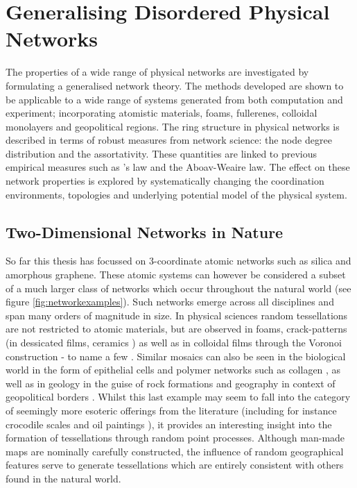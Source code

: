 \chapter{Generalising Disordered Physical Networks}
\label{ch:generalnetworks}

\begin{chapterabstract}
The properties of a wide range of physical \td{} networks are investigated by formulating a generalised network theory.
The methods developed are shown to be applicable to a wide range of systems generated from both computation and experiment; incorporating atomistic materials, foams, fullerenes, colloidal monolayers and geopolitical regions.
The ring structure in physical networks is described in terms of robust measures from network science: the node degree distribution and the assortativity.
These quantities are linked to previous empirical measures such as \lm's law and the Aboav\--Weaire law.
The effect on these network properties is explored by systematically changing the coordination environments, topologies and underlying potential model of the physical system.
\end{chapterabstract}

\section{Two\--Dimensional Networks in Nature}

So far this thesis has focussed on 3\--coordinate atomic networks such as silica and amorphous graphene.
These atomic systems can however be considered a subset of a much larger class of \td{} networks which occur throughout the natural world (see figure \ref{fig:networkexamples}).
Such networks emerge across all disciplines and span many orders of magnitude in size.
In physical sciences random tessellations are not restricted to atomic materials, but are observed in foams, crack\--patterns  (in dessicated films, ceramics \etc) as well as in colloidal films through the Voronoi construction \-- to name a few \cite{Durand2011,Tong2017,Noever1992,Ma2019,Earnshaw1994,Allain1995,Moncho-Jorda2000}.
Similar mosaics can also be seen in the biological world in the form of epithelial cells and polymer networks such as collagen \cite{Honda1978,Carter2017,Kim2016,Broedersz2014}, as well as in geology in the guise of rock formations and geography in context of geopolitical borders \cite{Weaire1984,Goehring2014,LeCaer1993}.
Whilst this last example may seem to fall into the category of seemingly more esoteric offerings from the literature (including for instance crocodile scales and oil paintings \cite{Milinkovitch2019,Flores2017}), it provides an interesting insight into the formation of tessellations through random point processes.
Although man\--made maps are nominally carefully constructed, the influence of random geographical features serve to generate tessellations which are entirely consistent with others found in the natural world.

